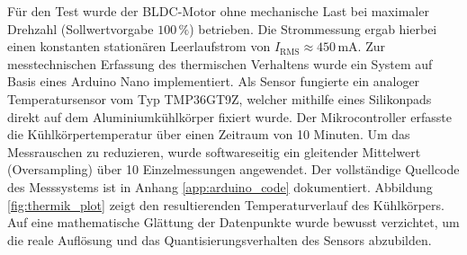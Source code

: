 Für den Test wurde der BLDC-Motor ohne mechanische Last bei maximaler Drehzahl (Sollwertvorgabe $100\,\%$) betrieben. Die Strommessung ergab hierbei einen konstanten stationären Leerlaufstrom von $I_{\mathrm{RMS}} \approx 450\,\mathrm{mA}$. 
Zur messtechnischen Erfassung des thermischen Verhaltens wurde ein System auf Basis eines Arduino Nano implementiert. Als Sensor fungierte ein analoger Temperatursensor vom Typ TMP36GT9Z, welcher mithilfe eines Silikonpads direkt auf dem Aluminiumkühlkörper fixiert wurde. Der Mikrocontroller erfasste die Kühlkörpertemperatur über einen Zeitraum von 10 Minuten. Um das Messrauschen zu reduzieren, wurde softwareseitig ein gleitender Mittelwert (Oversampling) über 10 Einzelmessungen angewendet. Der vollständige Quellcode des Messsystems ist in Anhang \ref{app:arduino_code} dokumentiert.
Abbildung \ref{fig:thermik_plot} zeigt den resultierenden Temperaturverlauf des Kühlkörpers. Auf eine mathematische Glättung der Datenpunkte wurde bewusst verzichtet, um die reale Auflösung und das Quantisierungsverhalten des Sensors abzubilden.

